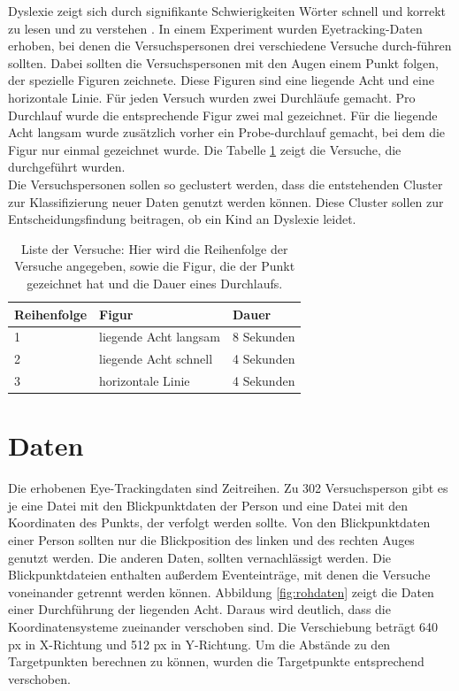 \documentclass[12pt]{article}
\begin{document}
Dyslexie zeigt sich durch signifikante Schwierigkeiten W\"orter schnell und korrekt zu lesen und zu verstehen \cite{Handlere818, Siegel2006}.
In einem Experiment wurden Eyetracking-Daten erhoben, bei denen die Versuchspersonen drei verschiedene Versuche durch-f\"uhren sollten. Dabei sollten die Versuchspersonen mit den Augen einem Punkt folgen, der spezielle Figuren zeichnete. Diese Figuren sind eine liegende Acht und eine horizontale Linie. F\"ur jeden Versuch wurden zwei Durchl\"aufe gemacht. Pro Durchlauf wurde die entsprechende Figur zwei mal gezeichnet. F\"ur die liegende Acht langsam wurde zus\"atzlich vorher ein Probe-durchlauf gemacht, bei dem die Figur nur einmal gezeichnet wurde.
Die Tabelle \ref{tab:Versuche} zeigt die Versuche, die durchgef\"uhrt wurden.\\
Die Versuchspersonen sollen so geclustert werden, dass die entstehenden Cluster zur Klassifizierung neuer Daten genutzt werden k\"onnen. Diese Cluster sollen zur Entscheidungsfindung beitragen, ob ein Kind an Dyslexie leidet.

\begin{table}[h]
	\caption{\label{tab:Versuche}Liste der Versuche: Hier wird die Reihenfolge der Versuche angegeben, sowie die Figur, die der Punkt ge\-zeich\-net hat und die Dauer eines Durchlaufs.}
	\noindent \centering{}
	\bgroup
	\def\arraystretch{2}  %
	\begin{tabular}{|l|l|l|}
		\hline
		\textbf{Reihenfolge} & \textbf{Figur} & \textbf{Dauer}\\
		\hline \hline
		1 & liegende Acht langsam & 8 Sekunden\\
		\hline
		2 & liegende Acht schnell & 4 Sekunden\\
		\hline
		3 & horizontale Linie & 4 Sekunden\\
		\hline
	\end{tabular}
	\egroup
\end{table}

\section*{Daten}
Die erhobenen Eye-Trackingdaten sind Zeitreihen. Zu 302 Versuchsperson gibt es je eine Datei mit den Blickpunktdaten der Person und eine Datei mit den Koordinaten des Punkts, der verfolgt werden sollte. Von den Blickpunktdaten einer Person sollten nur die Blickposition des linken und des rechten Auges genutzt werden. Die anderen Daten, sollten vernachl\"assigt werden. Die Blickpunktdateien enthalten au\ss{}erdem Eventeintr\"age, mit denen die Versuche voneinander getrennt werden k\"onnen.
Abbildung \ref{fig:rohdaten} zeigt die Daten einer Durchf\"uhrung der liegenden Acht. Daraus wird deutlich, dass die Koordinatensysteme zueinander verschoben sind. Die Verschiebung betr\"agt 640 px in X-Richtung und 512 px in Y-Richtung. Um die Abst\"ande zu den Targetpunkten berechnen zu k\"onnen, wurden die Targetpunkte entsprechend verschoben.
\end{document}
